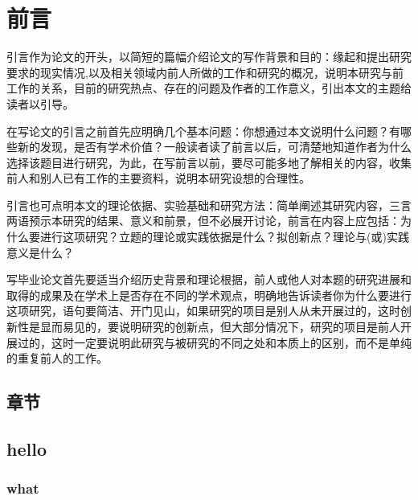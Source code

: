 \chapter{前言}\label{chap1:pre}

引言作为论文的开头，以简短的篇幅介绍论文的写作背景和目的：缘起和提出研究要求的现实情况,以及相关领域内前人所做的工作和研究的概况，说明本研究与前工作的关系，目前的研究热点、存在的问题及作者的工作意义，引出本文的主题给读者以引导。

在写论文的引言之前首先应明确几个基本问题：你想通过本文说明什么问题？有哪些新的发现，是否有学术价值？一般读者读了前言以后，可清楚地知道作者为什么选择该题目进行研究，为此，在写前言以前，要尽可能多地了解相关的内容，收集前人和别人已有工作的主要资料，说明本研究设想的合理性。

引言也可点明本文的理论依据、实验基础和研究方法：简单阐述其研究内容，三言两语预示本研究的结果、意义和前景，但不必展开讨论，前言在内容上应包括：为什么要进行这项研究？立题的理论或实践依据是什么？拟创新点？理论与(或)实践意义是什么？

写毕业论文首先要适当介绍历史背景和理论根据，前人或他人对本题的研究进展和取得的成果及在学术上是否存在不同的学术观点，明确地告诉读者你为什么要进行这项研究，语句要简洁、开门见山，如果研究的项目是别人从未开展过的，这时创新性是显而易见的，要说明研究的创新点，但大部分情况下，研究的项目是前人开展过的，这时一定要说明此研究与被研究的不同之处和本质上的区别，而不是单纯的重复前人的工作。

\section{章节}

\section{hello}\label{sec:is}
\lipsum[100-110]


\subsection{what}
\lipsum[110-112]
